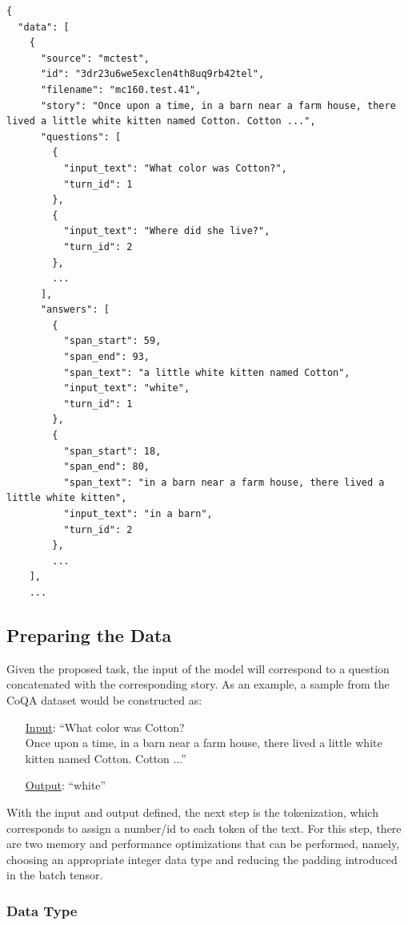 \documentclass[a4paper, 10pt]{article}
\begin{document}
        \begin{lstlisting}[style=json]
{
  "data": [
    {
      "source": "mctest",
      "id": "3dr23u6we5exclen4th8uq9rb42tel",
      "filename": "mc160.test.41",
      "story": "Once upon a time, in a barn near a farm house, there lived a little white kitten named Cotton. Cotton ...",
      "questions": [
        {
          "input_text": "What color was Cotton?",
          "turn_id": 1
        },
        {
          "input_text": "Where did she live?",
          "turn_id": 2
        },
        ...
      ],
      "answers": [
        {
          "span_start": 59,
          "span_end": 93,
          "span_text": "a little white kitten named Cotton",
          "input_text": "white",
          "turn_id": 1
        },
        {
          "span_start": 18,
          "span_end": 80,
          "span_text": "in a barn near a farm house, there lived a little white kitten",
          "input_text": "in a barn",
          "turn_id": 2
        },
        ...
    ],
    ...
        \end{lstlisting}

    \subsection{Preparing the Data}

        Given the proposed task, the input of the model will correspond to a question concatenated with the corresponding story. As an example, a sample from the CoQA dataset would be constructed as:
        
        \begin{itemize}
            \item [\underline{Input}:] ``What color was Cotton? \\ Once upon a time, in a barn near a farm house, there lived a little white kitten named Cotton. Cotton ...''
            \item [\underline{Output}:] ``white''
        \end{itemize}
        
        With the input and output defined, the next step is the tokenization, which corresponds to assign a number/id to each token of the text. For this step, there are two memory and performance optimizations that can be performed, namely, choosing an appropriate integer data type and reducing the padding introduced in the batch tensor.

        \subsubsection{Data Type}
        
\end{document}
